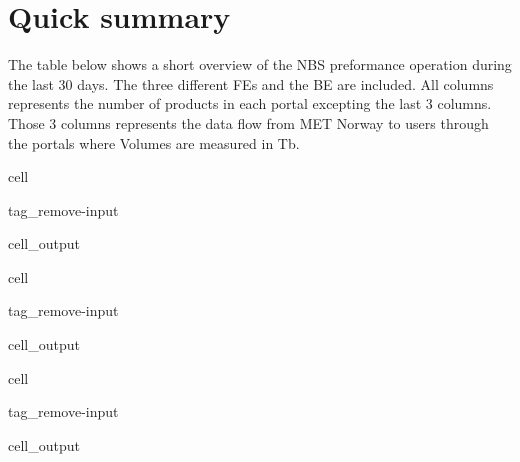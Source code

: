 \documentclass[letterpaper,10pt,english]{jupyterBook}
\begin{document}
\chapter{Quick summary}
\label{\detokenize{summary:quick-summary}}\label{\detokenize{summary::doc}}
\sphinxAtStartPar
The table below shows a short overview of the NBS preformance operation during the last 30 days. The three different FEs and the BE are included. All columns represents the number of products in each portal excepting the last 3 columns. Those 3 columns represents the data flow from MET Norway to users through the portals where Volumes are measured in Tb.

\begin{sphinxuseclass}{cell}
\begin{sphinxuseclass}{tag_remove-input}\begin{sphinxVerbatimOutput}

\begin{sphinxuseclass}{cell_output}
\end{sphinxuseclass}\end{sphinxVerbatimOutput}

\end{sphinxuseclass}
\end{sphinxuseclass}
\begin{sphinxuseclass}{cell}
\begin{sphinxuseclass}{tag_remove-input}\begin{sphinxVerbatimOutput}

\begin{sphinxuseclass}{cell_output}
\end{sphinxuseclass}\end{sphinxVerbatimOutput}

\end{sphinxuseclass}
\end{sphinxuseclass}
\begin{sphinxuseclass}{cell}
\begin{sphinxuseclass}{tag_remove-input}\begin{sphinxVerbatimOutput}

\begin{sphinxuseclass}{cell_output}
\end{sphinxuseclass}\end{sphinxVerbatimOutput}

\end{sphinxuseclass}
\end{sphinxuseclass}
\end{document}
